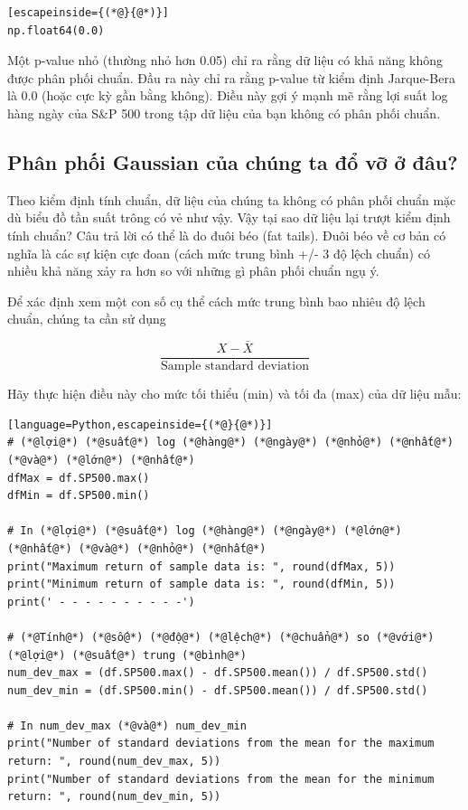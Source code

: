 \begin{lstlisting}[escapeinside={(*@}{@*)}]
np.float64(0.0)
\end{lstlisting}

Một p-value nhỏ (thường nhỏ hơn 0.05) chỉ ra rằng dữ liệu có khả năng không được phân phối chuẩn. Đầu ra này chỉ ra rằng p-value từ kiểm định Jarque-Bera là 0.0 (hoặc cực kỳ gần bằng không). Điều này gợi ý mạnh mẽ rằng lợi suất log hàng ngày của S\&P 500 trong tập dữ liệu của bạn không có phân phối chuẩn.

\subsection{Phân phối Gaussian của chúng ta đổ vỡ ở đâu?}

Theo kiểm định tính chuẩn, dữ liệu của chúng ta không có phân phối chuẩn mặc dù biểu đồ tần suất trông có vẻ như vậy. Vậy tại sao dữ liệu lại trượt kiểm định tính chuẩn? Câu trả lời có thể là do đuôi béo (fat tails). Đuôi béo về cơ bản có nghĩa là các sự kiện cực đoan (cách mức trung bình +/- 3 độ lệch chuẩn) có nhiều khả năng xảy ra hơn so với những gì phân phối chuẩn ngụ ý.

Để xác định xem một con số cụ thể cách mức trung bình bao nhiêu độ lệch chuẩn, chúng ta cần sử dụng

\[\frac{X - \bar{X}}{\text{Sample standard deviation}}\]

Hãy thực hiện điều này cho mức tối thiểu (min) và tối đa (max) của dữ liệu mẫu:

\begin{lstlisting}[language=Python,escapeinside={(*@}{@*)}]
# (*@lợi@*) (*@suất@*) log (*@hàng@*) (*@ngày@*) (*@nhỏ@*) (*@nhất@*) (*@và@*) (*@lớn@*) (*@nhất@*)
dfMax = df.SP500.max()
dfMin = df.SP500.min()

# In (*@lợi@*) (*@suất@*) log (*@hàng@*) (*@ngày@*) (*@lớn@*) (*@nhất@*) (*@và@*) (*@nhỏ@*) (*@nhất@*)
print("Maximum return of sample data is: ", round(dfMax, 5))
print("Minimum return of sample data is: ", round(dfMin, 5))
print(' - - - - - - - - - -')

# (*@Tính@*) (*@số@*) (*@độ@*) (*@lệch@*) (*@chuẩn@*) so (*@với@*) (*@lợi@*) (*@suất@*) trung (*@bình@*)
num_dev_max = (df.SP500.max() - df.SP500.mean()) / df.SP500.std()
num_dev_min = (df.SP500.min() - df.SP500.mean()) / df.SP500.std()

# In num_dev_max (*@và@*) num_dev_min
print("Number of standard deviations from the mean for the maximum return: ", round(num_dev_max, 5))
print("Number of standard deviations from the mean for the minimum return: ", round(num_dev_min, 5))
\end{lstlisting}

